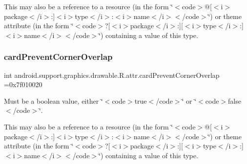 This may also be a reference to a resource (in the form \char`\"{}$<$code$>$@\mbox{[}$<$i$>$package$<$/i$>$\+:\mbox{]}$<$i$>$type$<$/i$>$\+:$<$i$>$name$<$/i$>$$<$/code$>$\char`\"{}) or theme attribute (in the form \char`\"{}$<$code$>$?\mbox{[}$<$i$>$package$<$/i$>$\+:\mbox{]}\mbox{[}$<$i$>$type$<$/i$>$\+:\mbox{]}$<$i$>$name$<$/i$>$$<$/code$>$\char`\"{}) containing a value of this type. \mbox{\label{classandroid_1_1support_1_1graphics_1_1drawable_1_1R_1_1attr_a207af6077044f4a78d562b17e18e9d64}} 
\subsubsection{\texorpdfstring{card\+Prevent\+Corner\+Overlap}{cardPreventCornerOverlap}}
{\footnotesize\ttfamily int android.\+support.\+graphics.\+drawable.\+R.\+attr.\+card\+Prevent\+Corner\+Overlap =0x7f010020\hspace{0.3cm}{\ttfamily [static]}}

Must be a boolean value, either \char`\"{}$<$code$>$true$<$/code$>$\char`\"{} or \char`\"{}$<$code$>$false$<$/code$>$\char`\"{}. 

This may also be a reference to a resource (in the form \char`\"{}$<$code$>$@\mbox{[}$<$i$>$package$<$/i$>$\+:\mbox{]}$<$i$>$type$<$/i$>$\+:$<$i$>$name$<$/i$>$$<$/code$>$\char`\"{}) or theme attribute (in the form \char`\"{}$<$code$>$?\mbox{[}$<$i$>$package$<$/i$>$\+:\mbox{]}\mbox{[}$<$i$>$type$<$/i$>$\+:\mbox{]}$<$i$>$name$<$/i$>$$<$/code$>$\char`\"{}) containing a value of this type. \mbox{\label{classandroid_1_1support_1_1graphics_1_1drawable_1_1R_1_1attr_accd8c0f7b970bea08effa8f74765292d}} 
